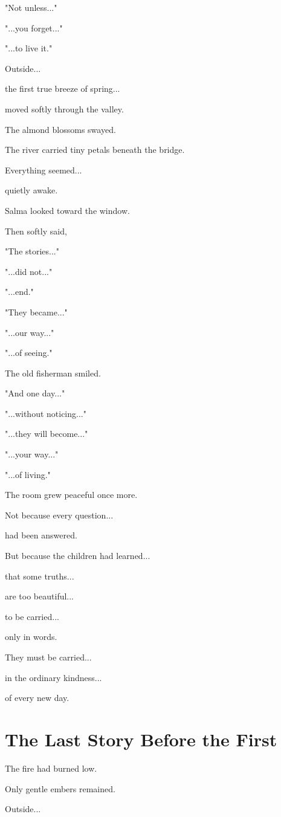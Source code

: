 \documentclass[12pt,openany]{book}
\begin{document}
"Not unless..."

"...you forget..."

"...to live it."

Outside...

the first true breeze of spring...

moved softly through the valley.

The almond blossoms swayed.

The river carried tiny petals beneath the bridge.

Everything seemed...

quietly awake.

Salma looked toward the window.

Then softly said,

"The stories..."

"...did not..."

"...end."

"They became..."

"...our way..."

"...of seeing."

The old fisherman smiled.

"And one day..."

"...without noticing..."

"...they will become..."

"...your way..."

"...of living."

The room grew peaceful once more.

Not because every question...

had been answered.

But because the children had learned...

that some truths...

are too beautiful...

to be carried...

only in words.

They must be carried...

in the ordinary kindness...

of every new day.
\section*{The Last Story Before the First}

The fire had burned low.

Only gentle embers remained.

Outside...
\end{document}
